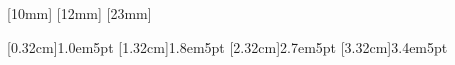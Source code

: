 \makeatletter
\def\@dotsep{0.3}%
\makeatother



[10mm]
{\fontsize{12pt}{15pt}}
{\contentslabel{4em}}
{}
{\contentspage}
%
[12mm]
{\fontsize{12pt}{15pt}}
{\contentslabel{2em}}
{}
{\contentspage}
%
[23mm]
{\fontsize{12pt}{15pt}}
{\contentslabel{3em}}
{}
{\contentspage}

[0.32cm]{\vspace{0.2em}}{1.0em}{5pt}
[1.32cm]{}{1.8em}{5pt}
[2.32cm]{}{2.7em}{5pt}
[3.32cm]{}{3.4em}{5pt}

\makeatletter
\newcommand\engcontentsname{\hfill CONTENTS \hfill}
\newcommand\tableofengcontents{%
    \if@twocolumn
      \@restonecoltrue\onecolumn
    \else
      \@restonecolfalse
    \fi
    \chapter*{\engcontentsname
        \@mkboth{%
           \MakeUppercase\engcontentsname}{\MakeUppercase\engcontentsname}}%
    \@starttoc{toe}%
    \if@restonecol\twocolumn\fi
    }
\newcommand\addengcontents[2]{%
    \addcontentsline{toe}{#1}{\protect\numberline{\csname the#1\endcsname}#2}}
\makeatother
\newcommand\echapter[1]{\addengcontents{chapter}{#1}}
\newcommand\esection[1]{\addengcontents{section}{#1}}
\newcommand\esubsection[1]{\addengcontents{subsection}{#1}}
\newcommand\esubsubsection[1]{\addengcontents{subsubsection}{#1}}


